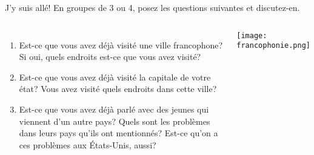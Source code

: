 \begin{frame}{J'y suis allé!}
  En groupes de 3 ou 4, posez les questions suivantes et discutez-en.
  \begin{columns}
      \small
      \begin{enumerate}
        \item Est-ce que vous avez déjà visité une ville francophone? Si oui, quels endroits est-ce que vous avez visité?
        \item Est-ce que vous avez déjà visité la capitale de votre état? Vous avez visité quels endroits dans cette ville?
        \item Est-ce que vous avez déjà parlé avec des jeunes qui viennent d'un autre pays? Quels sont les problèmes dans leurs pays qu'ils ont mentionnés? Est-ce qu'on a ces problèmes aux États-Unis, aussi?
      \end{enumerate}
      \begin{center}
        \texttt{[image: francophonie.png]}
      \end{center}
  \end{columns}
\end{frame}